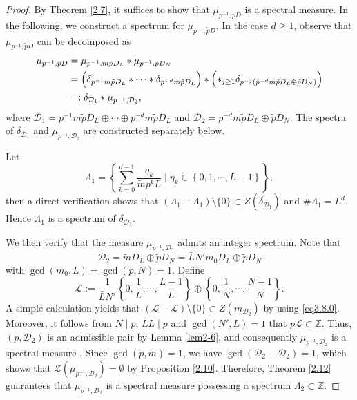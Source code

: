 \documentclass[11pt]{article}
\numberwithin{equation}{section}
\begin{document}
\begin{proof}
	
	By Theorem \ref{2.7}, it suffices to show that $\mu_{p^{-1}, \tilde{p}D}$ is a spectral measure. In the following, we construct a spectrum for $\mu_{p^{-1}, \tilde{p}D}$.  In the case $d\geq 1$, observe that $\mu_{p^{-1}, \tilde{p}D}$ can be  decomposed as
	\begin{align*}
		\mu_{p^{-1}, \tilde{p}D}
		&= \mu_{p^{-1}, m\tilde{p}D_L} * \mu_{p^{-1}, \tilde{p}D_N} \\
		&= \Bigl( \delta_{p^{-1} m\tilde{p}D_L} * \cdots * \delta_{p^{-d} m\tilde{p}D_L} \Bigr)
		* \Bigl( *_{j \ge 1} \delta_{p^{-j}(p^{-d}m\tilde{p}D_L \oplus \tilde{p}D_N)} \Bigr) \\
		&=: \delta_{\mathcal{D}_1} * \mu_{p^{-1},\mathcal{D}_2},
	\end{align*}
	where $\mathcal {D}_1=p^{-1}m\tilde{p}D_L\oplus \cdots\oplus p^{-d}m\tilde{p}D_L$ and $\mathcal {D}_2=p^{-d}m\tilde{p}D_{L}\oplus\tilde{p}D_N$.
The spectra of $\delta_{\mathcal {D}_1}$ and $\mu_{p^{-1},\mathcal {D}_2}$ are constructed separately below.
	
	Let
	$$
	\Lambda_1=\left\{\sum^{d-1}_{k=0} \frac{\eta_k}{\tilde{m} p^k L} \mid \eta_k \in \left\{0,1,\cdots, L-1\right\} \right\},
	$$
	then a direct verification shows that $(\Lambda_1-\Lambda_1)\setminus\{0\}\subset Z(\hat{\delta}_{\mathcal {D}_1})$ and $\#\Lambda_1=L^d$. Hence $\Lambda_1$ is a spectrum of  $\delta_{\mathcal {D}_1}$.
	
	We then verify that the measure $\mu_{p^{-1},\mathcal {D}_2}$ admits an integer spectrum. Note that $$\mathcal{D}_2=\tilde{m}D_{L}\oplus\tilde{p}D_N=\bar{L}N'm_0D_{L}\oplus\tilde{p}D_N$$
 with $\gcd(m_0,L)=\gcd(\tilde{p},N)=1$. Define
	$$
	\mathcal {L}:=\frac{1}{\bar{L}N'}\left\{0,\frac{1}{L},\cdots, \frac{L-1}{L}\right\}\oplus\left\{0,\frac{1}{N},\cdots,\frac{N-1}{N}\right\}.
	$$
	A simple calculation yields that $(\mathcal {L}-\mathcal {L})\setminus\{0\}\subset Z(m_{\mathcal {D}_2})$   by using \eqref{eq3.8.0}. Moreover, it follows from $N\mid p$, $\bar{L}L\mid p$ and $\gcd(N',L)=1$ that $p\mathcal {L}\subset \mathbb{Z}$. Thus, $(p, \mathcal {D}_2)$ is an admissible pair by Lemma \ref{lem2-6}, and consequently $\mu_{p^{-1},\mathcal {D}_2}$ is a spectral measure \cite{Dut-Hau-Lai2019}. Since
	$\gcd(\tilde{p},\tilde{m})=1$,
	we have $\gcd(\mathcal {D}_2 - \mathcal {D}_2)=1$, which shows that $\mathcal{Z}(\mu_{p^{-1},\mathcal {D}_2})=\emptyset$ by Proposition \ref{2.10}. Therefore, Theorem \ref{2.12} guarantees that
	$\mu_{p^{-1},\mathcal {D}_2}$ is a spectral measure possessing a spectrum $\Lambda_2\subset \mathbb{Z}$.
	

\end{proof}
\end{document}
